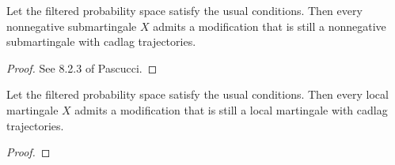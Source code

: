 

\begin{lemma}\label{lem:exists_cadlag_mod_of_nonneg_submg}
  Let the filtered probability space satisfy the usual conditions.
  Then every nonnegative submartingale $X$ admits a modification that is still a nonnegative submartingale with cadlag trajectories.
\end{lemma}

\begin{proof}
  See 8.2.3 of Pascucci.
\end{proof}


\begin{lemma}\label{lem:exists_cadlag_mod_of_local_mg}
  Let the filtered probability space satisfy the usual conditions.
  Then every local martingale $X$ admits a modification that is still a local martingale with cadlag trajectories.
\end{lemma}

\begin{proof}
\end{proof}
